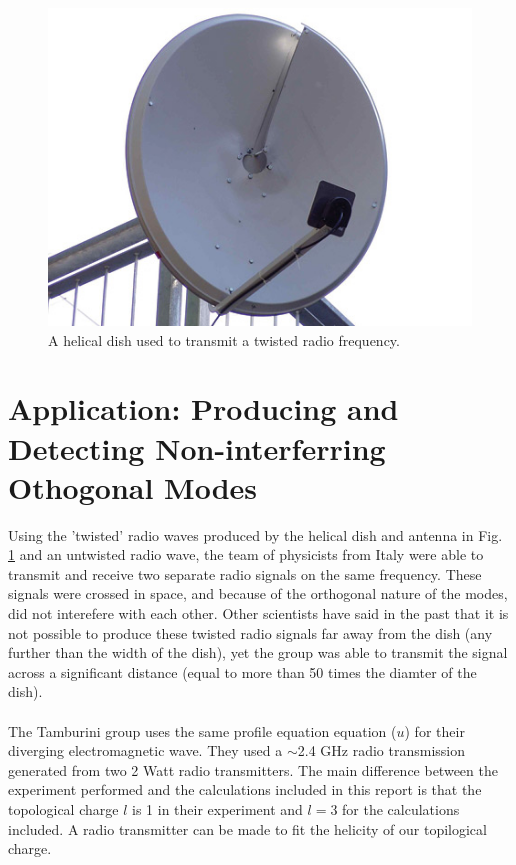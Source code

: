 \documentclass[10pt]{article}
\begin{document}
\begin{figure}[h]
\centering
\includegraphics[scale=0.5]{helical_dish}
\caption{A helical dish used to transmit a twisted radio frequency.\cite{radio}}
\label{dish}
\end{figure}





\section*{Application: Producing and Detecting Non-interferring Othogonal Modes}
Using the 'twisted' radio waves produced by the helical dish and antenna in Fig. \ref{dish} and an untwisted radio wave, the team of physicists from Italy were able to transmit and receive two separate radio signals on the same frequency. These signals were crossed in space, and because of the orthogonal nature of the modes, did not interefere with each other. Other scientists have said in the past that it is not possible to produce these twisted radio signals far away from the dish (any further than the width of the dish), yet the group was able to transmit the signal across a significant distance (equal to more than 50 times the diamter of the dish). \\
\\
The Tamburini group uses the same profile equation equation ($u$) for their diverging electromagnetic wave. They used a $\sim$2.4 GHz radio transmission generated from two 2 Watt radio transmitters\cite{radio}. The main difference between the experiment performed and the calculations included in this report is that the topological charge $l$ is 1 in their experiment and $l=3$ for the calculations included. A radio transmitter can be made to fit the helicity of our topilogical charge.
\end{document}
